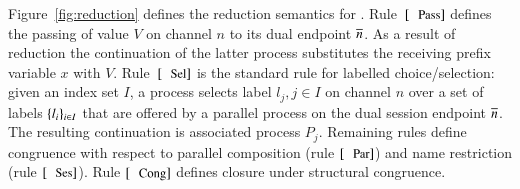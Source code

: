

\noi Figure~\ref{fig:reduction} defines
the reduction semantics for \HOp.
Rule~$\orule{Pass}$ defines the passing
of value $V$ on channel $n$ to its dual endpoint $\overline{n}$.
As a result of reduction the continuation of the 
latter process substitutes the receiving prefix variable $x$
with $V$.
Rule~$\orule{Sel}$ is the standard rule for labelled choice/selection:
given an index set $I$, 
a process selects label $l_j, j \in I$ on channel $n$ over a set of
labels $\{l_i\}_{i \in I}$ that are offered by a parallel process
on the dual session endpoint $\overline{n}$.
The resulting continuation is associated process $P_j$.
Remaining rules define congruence 
with respect to parallel composition (rule $\orule{Par}$)
and name restriction (rule $\orule{Ses}$).
Rule $\orule{Cong}$ defines closure under structural congruence.


